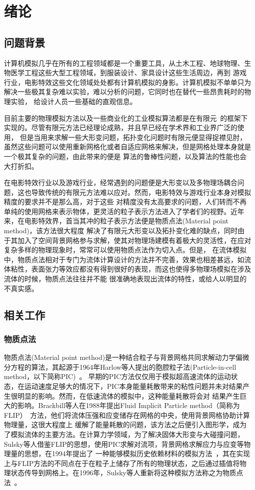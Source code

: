 
\chapter{绪论}
\label{chap_int}
\section{问题背景}
计算机模拟几乎在所有的工程领域都是一个重要工具，从土木工程、地球物理、生物医学工程这些大型工程领域，到服装设计、家具设计这些生活周边，再到
游戏行业，电影特效这些文化领域处处都有计算机模拟的身影。计算机模拟不单单只为解决一些极其复杂难以实验，难以分析的问题，它同时也在替代一些昂贵耗时的物理实验，
给设计人员一些基础的直观信息。

目前主要的物理模拟方法以及一些商业化的工业模拟算法都是在有限元~\cite{1942Variational}的框架下实现的。尽管有限元方法已经理论成熟，并且早已经在学术界和工业界广泛的使用，
但是当用来求解一些大形变问题，拓扑变化问题时有限元便显得捉襟见肘，虽然这些问题可以使用重新网格化或者自适应网格来解决，但是网格处理本身就是一个极其复杂的问题，由此带来的便是
算法的鲁棒性问题，以及算法的性能也会大打折扣。

在电影特效行业以及游戏行业，经常遇到的问题便是大形变以及多物理场耦合问题，这也导致传统的有限元方法难以应对。然而，电影特效与游戏行业本身对模拟精度的要求并不是那么高，对于这些
对精度没有太高要求的问题，人们转而不再单纯的使用网格来表示物体，更灵活的粒子表示方法进入了学者们的视野。近年来，在电影特效界，首当其冲的粒子表示方法便是物质点法(Material point method)，该方法很大程度
解决了有限元大形变以及拓扑变化难的缺点，同时由于其加入了空间背景网格参与求解，使其对物理场建模有着极大的灵活性，在应对复杂多样的物理现象时，常常可以使用物质点法作为切入点。但是，
在流体模拟中，物质点法相对于专门为流体计算设计的方法并不完善，效果也相差甚远，如流体粘性，表面张力等效应都没有得到很好的表现，而这也使得多物理场模拟在涉及流体的时候，物质点法往往并不能
很准确地表现出流体的特性，或给人以明显的不真实感。
\section{相关工作}
\subsection{物质点法}
物质点法(Material point method)是一种结合粒子与背景网格共同求解动力学偏微分方程的算法，其起源于1964年Harlow等人提出的胞腔粒子法(Particle-in-cell method，以下简称PIC)~\cite{harlow1962particle}。
早期的PIC方法仅仅用于模拟超高速流体的运动状态，在运动速度足够大的情况下，PIC本身能量耗散带来的粘性问题并未对结果产生很明显的影响。然而，在低速流体的模拟中，这种能量耗散将会对
结果产生巨大的影响。Brackbill等人在1988年提出Fluid Implicit Particle method（简称为FLIP）~\cite{brackbill1988flip}方法，他们将流体压强和应变储存在网格的中央，使用背景网格协助计算物理量，这很大程度上
缓解了能量耗散的问题，该方法之后便引入图形学，成为了模拟流体的主要方法。在计算力学领域，为了解决固体大形变与大碰撞问题，Sulsky等人借鉴FLIP的思想，使用PIC求解对流项，背景网格求解应力与应变等物理量的思想，在1994年提出了
一种能够模拟历史依赖材料的模拟方法~\cite{sulsky1994particle}，其在实现上与FLIP方法的不同点在于在粒子上储存了所有的物理状态，之后通过插值将物理状态传导到网格上。在1996年，Sulsky等人重新将这种模拟方法称之为物质点法~\cite{sulsky1996axisymmetric}。

